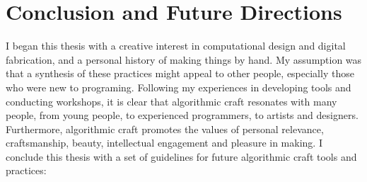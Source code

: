 \chapter{Conclusion and Future Directions}
	
	I began this thesis with a creative interest in computational design and digital fabrication, and a personal history of making things by hand. My assumption was that a synthesis of these practices might appeal to other people, especially those who were new to programing. Following my experiences in developing  tools and conducting workshops, it is clear that  algorithmic craft resonates with many people, from young people, to experienced programmers, to artists and designers. Furthermore, algorithmic craft promotes the values of personal relevance, craftsmanship, beauty, intellectual engagement and pleasure in making. I conclude this thesis with a set of guidelines for future algorithmic craft tools and practices:
	
